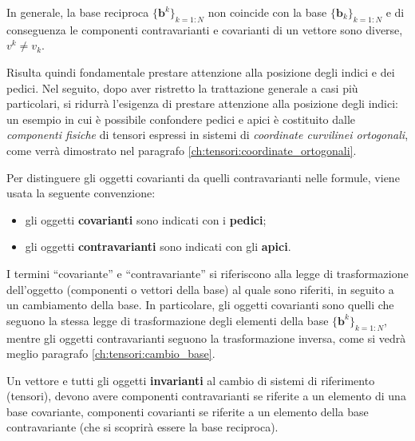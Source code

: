 \begin{remark}
 In generale, la base reciproca $\{ \bm{b}^k \}_{k=1:N}$ non coincide con la base $\{ \bm{b}_k \}_{k=1:N}$ e di conseguenza le componenti contravarianti e covarianti di un vettore sono diverse, $v^k \neq v_k$.

 Risulta quindi fondamentale prestare attenzione alla posizione degli indici e dei pedici. Nel seguito, dopo aver ristretto la trattazione generale a casi più particolari, si ridurrà l'esigenza di prestare attenzione alla posizione degli indici: un esempio in cui è possibile confondere pedici e apici è costituito dalle \textit{componenti fisiche} di tensori espressi in sistemi di \textit{coordinate curvilinei ortogonali}, come verrà dimostrato nel paragrafo \ref{ch:tensori:coordinate_ortogonali}.
\end{remark}
%
\begin{notation} Per distinguere gli oggetti covarianti da quelli contravarianti nelle formule, viene usata la seguente convenzione:
\begin{itemize}
\item gli oggetti \textbf{covarianti} sono indicati con i \textbf{pedici};
\item gli oggetti \textbf{contravarianti} sono indicati con gli \textbf{apici}.
\end{itemize}
\end{notation}
%
\begin{remark}
 I termini ``covariante'' e ``contravariante'' si riferiscono alla legge di trasformazione dell'oggetto (componenti o vettori della base) al quale sono riferiti, in seguito a un cambiamento della base. In particolare, gli oggetti covarianti sono quelli che seguono la stessa legge di trasformazione degli elementi della base  $\{ \bm{b}^k \}_{k=1:N}$, mentre gli oggetti contravarianti seguono la trasformazione inversa, come si vedrà meglio paragrafo \ref{ch:tensori:cambio_base}.

 Un vettore e tutti gli oggetti \textbf{invarianti} al cambio di sistemi di riferimento (tensori), devono avere componenti contravarianti se riferite a un elemento di una base covariante, componenti covarianti se riferite a un elemento della base contravariante (che si scoprirà essere la base reciproca).
\end{remark}
  
